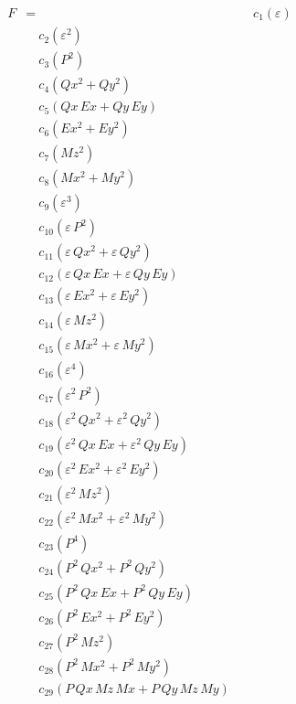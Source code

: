 \documentclass{article}
\begin{document}
\begin{align*}
F &=
  &\quad c_{1} \left(ε\right) \\
  &\quad c_{2} \left(ε^{2}\right) \\
  &\quad c_{3} \left(P^{2}\right) \\
  &\quad c_{4} \left(Qx^{2} + Qy^{2}\right) \\
  &\quad c_{5} \left(Qx\,Ex + Qy\,Ey\right) \\
  &\quad c_{6} \left(Ex^{2} + Ey^{2}\right) \\
  &\quad c_{7} \left(Mz^{2}\right) \\
  &\quad c_{8} \left(Mx^{2} + My^{2}\right) \\
  &\quad c_{9} \left(ε^{3}\right) \\
  &\quad c_{10} \left(ε\,P^{2}\right) \\
  &\quad c_{11} \left(ε\,Qx^{2} + ε\,Qy^{2}\right) \\
  &\quad c_{12} \left(ε\,Qx\,Ex + ε\,Qy\,Ey\right) \\
  &\quad c_{13} \left(ε\,Ex^{2} + ε\,Ey^{2}\right) \\
  &\quad c_{14} \left(ε\,Mz^{2}\right) \\
  &\quad c_{15} \left(ε\,Mx^{2} + ε\,My^{2}\right) \\
  &\quad c_{16} \left(ε^{4}\right) \\
  &\quad c_{17} \left(ε^{2}\,P^{2}\right) \\
  &\quad c_{18} \left(ε^{2}\,Qx^{2} + ε^{2}\,Qy^{2}\right) \\
  &\quad c_{19} \left(ε^{2}\,Qx\,Ex + ε^{2}\,Qy\,Ey\right) \\
  &\quad c_{20} \left(ε^{2}\,Ex^{2} + ε^{2}\,Ey^{2}\right) \\
  &\quad c_{21} \left(ε^{2}\,Mz^{2}\right) \\
  &\quad c_{22} \left(ε^{2}\,Mx^{2} + ε^{2}\,My^{2}\right) \\
  &\quad c_{23} \left(P^{4}\right) \\
  &\quad c_{24} \left(P^{2}\,Qx^{2} + P^{2}\,Qy^{2}\right) \\
  &\quad c_{25} \left(P^{2}\,Qx\,Ex + P^{2}\,Qy\,Ey\right) \\
  &\quad c_{26} \left(P^{2}\,Ex^{2} + P^{2}\,Ey^{2}\right) \\
  &\quad c_{27} \left(P^{2}\,Mz^{2}\right) \\
  &\quad c_{28} \left(P^{2}\,Mx^{2} + P^{2}\,My^{2}\right) \\
  &\quad c_{29} \left(P\,Qx\,Mz\,Mx + P\,Qy\,Mz\,My\right) \\

\end{align*}
\end{document}
